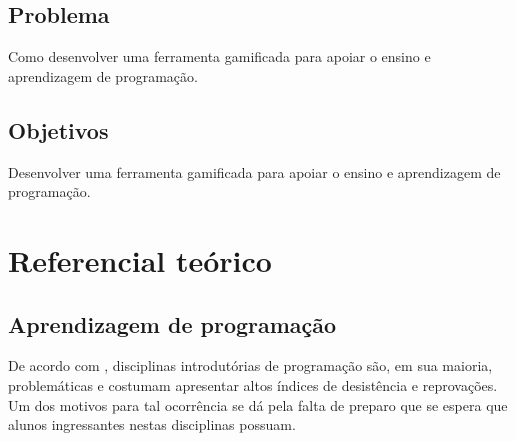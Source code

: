 \section{Problema}
Como desenvolver uma ferramenta gamificada para apoiar o ensino e aprendizagem de programação.
 
\section{Objetivos}
Desenvolver uma ferramenta gamificada para apoiar o ensino e aprendizagem de programação.



\chapter{Referencial teórico}

\section{Aprendizagem de programação}
De acordo com , disciplinas introdutórias de programação são, em sua maioria, problemáticas e costumam apresentar
altos índices de desistência e reprovações. Um dos motivos para tal ocorrência se dá pela falta de preparo que se espera que alunos
ingressantes nestas disciplinas possuam.


